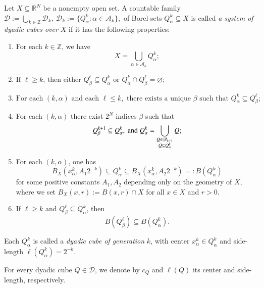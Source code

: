 \documentclass[12pt]{amsart}
\begin{document}
\begin{definition}\label{Defsystem}{\rm
Let $X\subseteq \mathbb{R}^N$ be a nonempty open set. A countable family
$
    \mathscr{D}
    := \bigcup_{k\in\mathbb{Z}}\mathscr{D}_{k}, \
    \mathscr{D}_{k}
    :=\{Q^k_{\alpha}\colon \alpha\in \mathscr{A}_k\},
$
of Borel sets $Q^k_{\alpha}\subseteq X$ is called \textit{a
system of dyadic cubes over  $X$}  if it has the following properties:

\begin{enumerate}
  \item[(i)] For each $k\in\mathbb{Z}$, we have $$    X
    = \bigcup_{\alpha\in \mathscr{A}_k} Q^k_{\alpha};$$\smallskip

  \item[(ii)] $\text{If }\ell\geq k\text{, then either }
        Q^{\ell}_{\beta}\subseteq Q^k_{\alpha}\text{ or }
        Q^k_{\alpha}\cap Q^{\ell}_{\beta}=\varnothing$;\smallskip

  \item[(iii)] $
    \text{For each }(k,\alpha)\text{ and each } \ell\leq k,
    \text{ there exists a unique } \beta
    \text{ such that }Q^{k}_{\alpha}\subseteq Q^\ell_{\beta};
$

\smallskip

\item[(iv)] For each $(k,\alpha)$ there exist $2^N$ indices $\beta$ such that
    $$ Q^{k+1}_{\beta}\subseteq Q^k_{\alpha},\ {\rm and}\
        Q^k_{\alpha} =\bigcup_{{\substack{Q\in\mathscr{D}_{k+1}\\ Q\subseteq Q^k_{\alpha}}}}Q;$$

\smallskip

\item[(v)] For each $(k,\alpha)$, one has $$B_X(x^k_{\alpha},A_1 2^{-k})
    \subseteq Q^k_{\alpha}\subseteq B_X(x^k_{\alpha},A_2 2^{-k})
    =: B(Q^k_{\alpha})$$
    for some positive constants $A_1,A_2$ depending only on the geometry of $X$, {where we set $B_X(x,r):=B(x,r)\cap X$ for all $x\in X$ and $r>0$.}

\smallskip

\item [(vi)]  If $\ell\geq k$ and
   $Q^{\ell}_{\beta}\subseteq Q^k_{\alpha}$, then
   $$B(Q^{\ell}_{\beta})\subseteq B(Q^k_{\alpha}).$$
\end{enumerate}



   }
\end{definition}

Each $Q^k_{\alpha}$ is called a \textit{dyadic cube of generation} $k$, with center $x^k_{\alpha}\in Q^k_{\alpha}$ and side-length $\ell(Q^k_{\alpha})=2^{-k}$.
\begin{nota}
For every dyadic cube $Q\in\mathscr{D}$, we denote by $c_Q$ and $\ell(Q)$ its center and side-length, respectively.
\end{nota}
\end{document}

